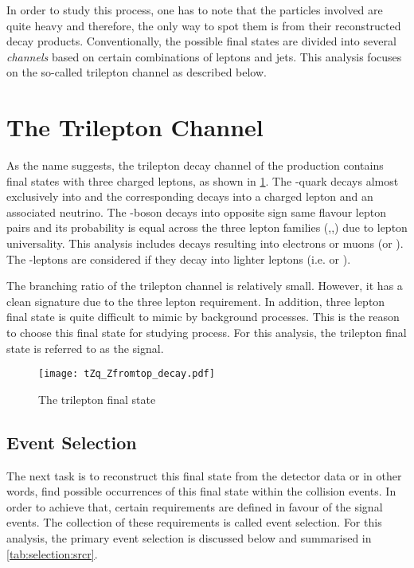 In order to study this process, one has to note 
that the particles involved are quite heavy and therefore,
the only way to spot them is from their reconstructed decay products. 
Conventionally, the possible final states are divided into several \textit{channels}
based on certain combinations of leptons and jets. This analysis focuses on
the so-called trilepton channel as described below.

\section{The \tZqsec Trilepton Channel}
As the name suggests, the trilepton decay channel of the \tZq production 
contains final states with three charged leptons, as shown in \cref{fig:tZqtrilep}. The
\Ptop-quark decays almost exclusively into \Pbottom\PW and the corresponding \PW decays into a charged lepton and
an associated neutrino. The \PZ-boson decays into opposite sign same flavour lepton pairs and its probability 
is equal across the three lepton families (\Pelectron,\Pmuon,\Ptauon) due to 
lepton universality. This analysis includes \PZ decays resulting into electrons or muons 
(\Pelectron\APelectron or \Pmuon\APmuon). The \Ptauon-leptons are considered if they decay into lighter
leptons (i.e. \Pelectron or \Pmuon).

The branching ratio of the trilepton channel is relatively small. However, it has a clean 
signature due to the three lepton requirement. In addition, three lepton final state is quite difficult
to mimic by background processes. This is the reason to choose this final state for studying \tZq process.
For this analysis, the trilepton final state is referred to as the signal.

\begin{figure}
  \centering
      \texttt{[image: tZq\_Zfromtop\_decay.pdf]}
      \caption{The \tZq trilepton final state}
         \label{fig:tZqtrilep}
\end{figure}

\subsection{Event Selection}
The next task is to reconstruct this final state from the detector data or in other words, find
possible occurrences of this final state within the collision events. In order to achieve that,
certain requirements are defined in favour of the signal events. The collection of these requirements
is called event selection. For this analysis, the primary event selection is discussed below and
summarised in \cref{tab:selection:srcr}.

